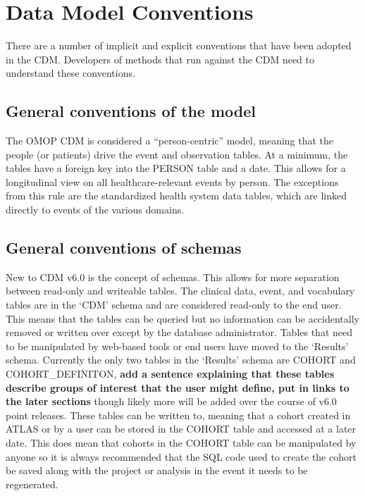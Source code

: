 \documentclass[]{book}
\begin{document}
\section{Data Model Conventions}\label{data-model-conventions}

There are a number of implicit and explicit conventions that have been
adopted in the CDM. Developers of methods that run against the CDM need
to understand these conventions.

\subsection{General conventions of the model}\label{model-conv}

The OMOP CDM is considered a ``person-centric'' model, meaning that the
people (or patients) drive the event and observation tables. At a
minimum, the tables have a foreign key into the PERSON table and a date.
This allows for a longitudinal view on all healthcare-relevant events by
person. The exceptions from this rule are the standardized health system
data tables, which are linked directly to events of the various domains.

\subsection{General conventions of
schemas}\label{general-conventions-of-schemas}

New to CDM v6.0 is the concept of schemas. This allows for more
separation between read-only and writeable tables. The clinical data,
event, and vocabulary tables are in the `CDM' schema and are considered
read-only to the end user. This means that the tables can be queried but
no information can be accidentally removed or written over except by the
database administrator. Tables that need to be manipulated by web-based
tools or end users have moved to the `Results' schema. Currently the
only two tables in the `Results' schema are COHORT and
COHORT\_DEFINITON, \textbf{add a sentence explaining that these tables
describe groups of interest that the user might define, put in links to
the later sections} though likely more will be added over the course of
v6.0 point releases. These tables can be written to, meaning that a
cohort created in ATLAS or by a user can be stored in the COHORT table
and accessed at a later date. This does mean that cohorts in the COHORT
table can be manipulated by anyone so it is always recommended that the
SQL code used to create the cohort be saved along with the project or
analysis in the event it needs to be regenerated.
\end{document}
